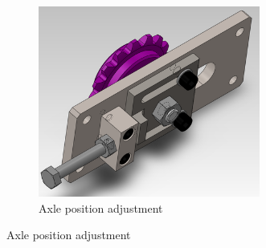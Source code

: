 \begin{figure}[H]
\begin{subfigure}[b]{.32\linewidth}
		\includegraphics[width=0.8\textwidth]{imgs/chain_axletens.png}
		\caption{Axle position adjustment}
	\end{subfigure}
	

\end{figure}
